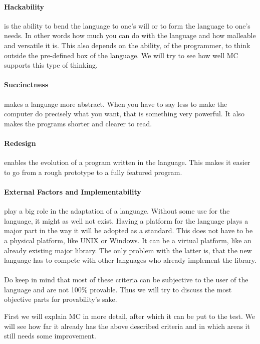 \begin{multicols}{2}
   \paragraph{Hackability}
   is the ability to bend the language to one's will or to form the language to one's needs.
   In other words how much you can do with the language and how malleable and versatile it is.
   This also depends on the ability, of the programmer, to think outside the pre-defined box of the language.
   We will try to see how well MC supports this type of thinking.

   \paragraph{Succinctness}
   makes a language more abstract.
   When you have to say less to make the computer do precisely what you want, that is something very powerful.
   It also makes the programs shorter and clearer to read.

   \paragraph{Redesign}
   enables the evolution of a program written in the language.
   This makes it easier to go from a rough prototype to a fully featured program.

   \paragraph{External Factors and Implementability}
   play a big role in the adaptation of a language.
   Without some use for the language, it might as well not exist.
   Having a platform for the language plays a major part in the way it will be adopted as a standard.
   This does not have to be a physical platform, like UNIX or Windows.
   It can be a virtual platform, like an already existing major library.
   The only problem with the latter is, that the new language has to compete with other languages who already implement the library.

   \paragraph{}
   Do keep in mind that most of these criteria can be subjective to the user of the language and are not 100\% provable.
   Thus we will try to discuss the most objective parts for provability's sake.

   First we will explain MC in more detail, after which it can be put to the test.
   We will see how far it already has the above described criteria and in which areas it still needs some improvement.

\end{multicols}
